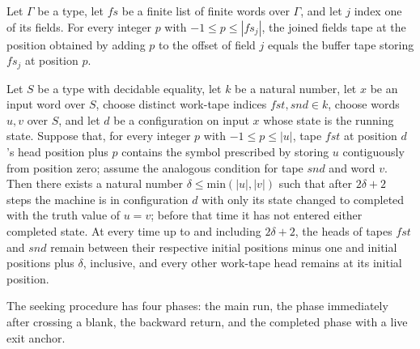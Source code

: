 \begin{theorem}
\label{Turing.fieldsTape_field}
\leanok
{}
Let $\Gamma$ be a type, let $fs$ be a finite list of finite words over $\Gamma$, and let
$j$ index one of its fields. For every integer $p$ with $-1 \le p \le |fs_j|$, the
joined fields tape at the position obtained by adding $p$ to the offset of field $j$
equals the buffer tape storing $fs_j$ at position $p$.
\end{theorem}

\begin{theorem}
\label{Turing.compareTM_run_ofCfg}
\leanok
{}
Let $S$ be a type with decidable equality, let $k$ be a natural number, let $x$ be
an input word over $S$, choose distinct work-tape indices $fst,snd\in k$, choose
words $u,v$ over $S$, and let $d$ be a configuration on input $x$ whose state is
the running state. Suppose that, for every integer $p$ with $-1\le p\le |u|$, tape $fst$
at position $d$'s head position plus $p$ contains the symbol prescribed by storing $u$
contiguously from position zero; assume the analogous condition for tape $snd$ and word
$v$. Then there exists a natural number $\delta\le\text{min}(|u|,|v|)$ such that after
$2\delta+2$ steps the machine is in configuration $d$ with only its state changed to
completed with the truth value of $u=v$; before that time it has not entered either
completed state. At every time up to and including $2\delta+2$, the heads of tapes $fst$
and $snd$ remain between their respective initial positions minus one and initial
positions plus $\delta$, inclusive, and every other work-tape head remains at its
initial position.
\end{theorem}

\begin{definition}
\label{Turing.SeekPhase}
\leanok
The seeking procedure has four phases: the main run, the phase immediately after
crossing a blank, the backward return, and the completed phase with a live exit anchor.
\end{definition}

